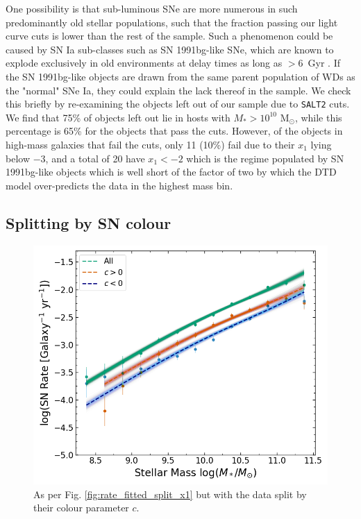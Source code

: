 \documentclass[fleqn,usenatbib]{mnras}
\begin{document}
One possibility is that sub-luminous SNe are more numerous in such predominantly old stellar populations, such that the fraction passing our light curve cuts is lower than the rest of the sample. Such a phenomenon could be caused by SN Ia sub-classes such as SN 1991bg-like SNe, which are known to explode exclusively in old environments \citep{Perets2010} at delay times as long as $>6$~Gyr \citep{Panther2019}. If the SN 1991bg-like objects are drawn from the same parent population of WDs as the "normal" SNe Ia, they could explain the lack thereof in the sample. We check this briefly by re-examining the objects left out of our sample due to \texttt{SALT2} cuts. We find that 75\% of objects left out lie in hosts with $M_*>10^{10}$ M$_{\odot}$, while this percentage is 65\% for the objects that pass the cuts. However, of the objects in high-mass galaxies that fail the cuts, only 11 (10\%) fail due to their $x_1$ lying below $-3$, and a total of 20 have $x_1 <-2$ which is the regime populated by SN 1991bg-like objects which is well short of the factor of two by which the DTD model over-predicts the data in the highest mass bin.

\subsection{Splitting by SN colour \label{subsec:split_c}}
\begin{figure}
    \centering
    \includegraphics[width=.5\textwidth]{figs/rate_vs_mass_DTD_fit_beta_norm_Qerf1.1_split_c.png}
    \caption{As per Fig. \ref{fig:rate_fitted_split_x1} but with the data split by their colour parameter $c$.%
    \label{fig:rate_fitted_split_c}}
\end{figure}
\end{document}
